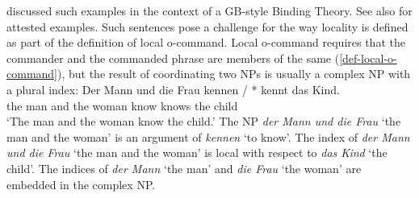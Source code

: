 \documentclass[output=paper,biblatex,babelshorthands,newtxmath,draftmode,colorlinks,citecolor=brown]{langscibook}
\begin{document}
\citet[]{Fanselow87a} discussed such examples in the context of a GB-style Binding
Theory. See also  for attested examples.
Such sentences pose a challenge for the way locality is defined as part of the definition of local
o-command. Local o-command requires that the commander and the commanded phrase are members of the
same \argstl (\ref{def-local-o-command}), but the result of coordinating two NPs is usually a complex NP with a plural index:
\ea
\gll Der Mann und die Frau kennen / * kennt das Kind.\\
     the man  and the woman know {} {} knows the child\\
\glt `The man and the woman know the child.'
\z
The NP \emph{der Mann und die Frau} `the man and the woman' is an argument of \emph{kennen} `to know'. The index of
\emph{der Mann und die Frau} `the man and the woman' is local with respect to \emph{das Kind} `the child'. The indices of
\emph{der Mann} `the man' and \emph{die Frau} `the woman' are embedded in the complex NP.
\end{document}
